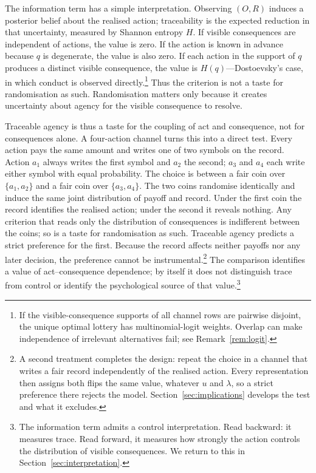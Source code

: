\documentclass[11pt,a4paper]{article}
\theoremstyle{definition}
\newcommand{\Sh}{H}
\newcommand{\1}{\mathbf 1}
\begin{document}
The information term has a simple interpretation.  Observing $(O,R)$ induces a posterior belief about the realised
action; traceability is the expected reduction in that uncertainty, measured by Shannon entropy $\Sh$.  If visible
consequences are independent of actions, the value is zero.  If the action is known in advance because
$q$ is degenerate, the value is also zero.  If each action in the support of $q$ produces a distinct visible
consequence, the value is $\Sh(q)$---Dostoevsky's case, in which conduct is observed directly.\footnote{If the
visible-consequence supports of all channel rows are pairwise disjoint, the unique optimal lottery has
multinomial-logit weights.  Overlap can make independence of irrelevant alternatives fail; see
Remark~\ref{rem:logit}.}  Thus the criterion is
not a taste for randomisation as such.  Randomisation matters only because it creates uncertainty about agency for the
visible consequence to resolve.



Traceable agency is thus a taste for the coupling of act and consequence, not for consequences alone.  A
four-action channel turns this into a direct test.  Every action pays the same amount and writes one of two
symbols on the record.  Action $a_1$ always writes the first symbol and $a_2$ the second; $a_3$ and $a_4$ each
write either symbol with equal probability.  The choice is between a fair coin over $\{a_1,a_2\}$ and a fair
coin over $\{a_3,a_4\}$.  The two coins randomise identically and induce the same joint distribution of payoff
and record.  Under the first coin the record identifies the realised action; under the second it reveals
nothing.  Any criterion that reads only the distribution of consequences is indifferent between the coins; so is
a taste for randomisation as such.  Traceable agency predicts a strict preference for the first.  Because the
record affects neither payoffs nor any later decision, the preference cannot be
instrumental.\footnote{A second treatment completes the design: repeat
the choice in a channel that writes a fair record independently of the realised action.  Every representation
then assigns both flips the same value, whatever $u$ and $\lambda$, so a strict preference there rejects the
model.  Section~\ref{sec:implications} develops the test and what it excludes.}  The comparison identifies a
value of act--consequence dependence; by itself it does not distinguish trace from control or identify the
psychological source of that value.\footnote{The information term admits a control interpretation. Read backward: it measures trace. Read forward, it measures how strongly the action controls the distribution of visible consequences. We return to this in Section~\ref{sec:interpretation}.}
\end{document}
